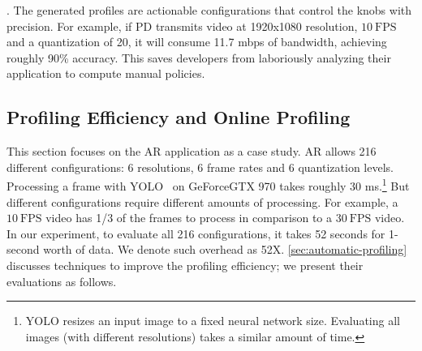 . The generated profiles are actionable
configurations that control the knobs with precision. For example,
if PD transmits video at 1920x1080 resolution, \(10~\text{FPS}\) and
a quantization of 20, it will consume 11.7 mbps of bandwidth, achieving roughly
90\% accuracy. This saves developers from laboriously analyzing their
application to compute manual policies.

\subsection{Profiling Efficiency and Online Profiling}
\label{sec:online-profiling}

This section focuses on the AR application as a case study. AR allows 216
different configurations: 6 resolutions, 6 frame rates and 6
quantization levels. Processing a frame with YOLO~\cite{redmon2016yolo9000} on
GeForce\textregistered\space GTX 970 takes roughly 30 ms.\footnote{YOLO resizes
  an input image to a fixed neural network size. Evaluating all images (with
  different resolutions) takes a similar amount of time.} But different
configurations require different amounts of processing. For example, a \(10~\text{FPS}\)
video has 1/3 of the frames to process in comparison to a \(30~\text{FPS}\) video.
In our experiment, to evaluate all 216 configurations, it takes 52 seconds for 1-second
worth of data. We denote such overhead as 52X\@. \autoref{sec:automatic-profiling} discusses techniques to improve the
profiling efficiency; we present their evaluations as follows.

